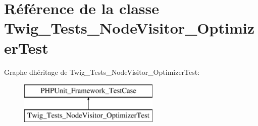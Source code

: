 \hypertarget{class_twig___tests___node_visitor___optimizer_test}{}\section{Référence de la classe Twig\+\_\+\+Tests\+\_\+\+Node\+Visitor\+\_\+\+Optimizer\+Test}
\label{class_twig___tests___node_visitor___optimizer_test}
Graphe d\textquotesingle{}héritage de Twig\+\_\+\+Tests\+\_\+\+Node\+Visitor\+\_\+\+Optimizer\+Test\+:\begin{figure}[H]
\begin{center}
\leavevmode
\includegraphics[height=2.000000cm]{class_twig___tests___node_visitor___optimizer_test}
\end{center}
\end{figure}
